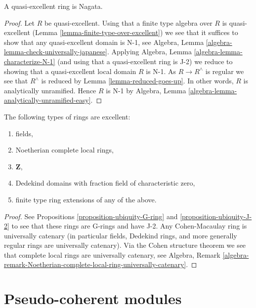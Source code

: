 \begin{lemma}
\label{lemma-quasi-excellent-nagata}
A quasi-excellent ring is Nagata.
\end{lemma}

\begin{proof}
Let $R$ be quasi-excellent.
Using that a finite type algebra over $R$ is quasi-excellent
(Lemma \ref{lemma-finite-type-over-excellent}) we see that
it suffices to show that any quasi-excellent domain is N-1, see
Algebra, Lemma \ref{algebra-lemma-check-universally-japanese}.
Applying Algebra, Lemma \ref{algebra-lemma-characterize-N-1}
(and using that a quasi-excellent ring is J-2) we reduce
to showing that a quasi-excellent local domain $R$ is N-1.
As $R \to R^\wedge$ is regular we see that $R^\wedge$
is reduced by Lemma \ref{lemma-reduced-goes-up}.
In other words, $R$ is analytically unramified.
Hence $R$ is N-1 by
Algebra, Lemma \ref{algebra-lemma-analytically-unramified-easy}.
\end{proof}

\begin{proposition}
\label{proposition-ubiquity-excellent}
The following types of rings are excellent:
\begin{enumerate}
\item fields,
\item Noetherian complete local rings,
\item $\mathbf{Z}$,
\item Dedekind domains with fraction field of characteristic zero,
\item finite type ring extensions of any of the above.
\end{enumerate}
\end{proposition}

\begin{proof}
See Propositions \ref{proposition-ubiquity-G-ring} and
\ref{proposition-ubiquity-J-2} to see that these rings are
G-rings and have J-2. Any Cohen-Macaulay ring is universally
catenary (in particular fields, Dedekind rings, and more generally
regular rings are universally catenary). Via the Cohen structure theorem 
we see that complete local rings are universally catenary, see
Algebra, Remark
\ref{algebra-remark-Noetherian-complete-local-ring-universally-catenary}.
\end{proof}






\section{Pseudo-coherent modules}
\label{section-pseudo-coherent}

